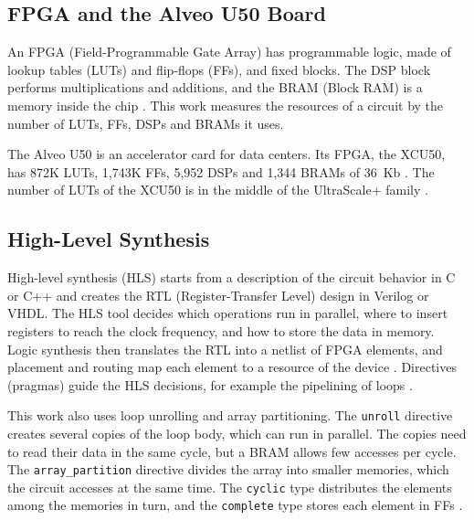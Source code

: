 \subsection{FPGA and the Alveo U50 Board}\label{subsec:fpga}\label{subsec:alveo-u50}
An FPGA (Field-Programmable Gate Array) has programmable logic, made of lookup tables (LUTs) and flip-flops (FFs), and fixed blocks. The DSP block performs multiplications and additions, and the BRAM (Block RAM) is a memory inside the chip \cite{kastner-hls}. This work measures the resources of a circuit by the number of LUTs, FFs, DSPs and BRAMs it uses.

The Alveo U50 is an accelerator card for data centers. Its FPGA, the XCU50, has 872K LUTs, 1,743K FFs, 5,952 DSPs and 1,344 BRAMs of 36~Kb \cite{ds965}. The number of LUTs of the XCU50 is in the middle of the UltraScale+ family \cite{xmp103}.

\subsection{High-Level Synthesis}\label{subsec:hls}
High-level synthesis (HLS) starts from a description of the circuit behavior in C or C++ and creates the RTL (Register-Transfer Level) design in Verilog or VHDL. The HLS tool decides which operations run in parallel, where to insert registers to reach the clock frequency, and how to store the data in memory. Logic synthesis then translates the RTL into a netlist of FPGA elements, and placement and routing map each element to a resource of the device \cite{kastner-hls}. Directives (pragmas) guide the HLS decisions, for example the pipelining of loops \cite{ug1399}.

This work also uses loop unrolling and array partitioning. The \texttt{unroll} directive creates several copies of the loop body, which can run in parallel. The copies need to read their data in the same cycle, but a BRAM allows few accesses per cycle. The \texttt{array\_partition} directive divides the array into smaller memories, which the circuit accesses at the same time. The \texttt{cyclic} type distributes the elements among the memories in turn, and the \texttt{complete} type stores each element in FFs \cite{kastner-hls}.

